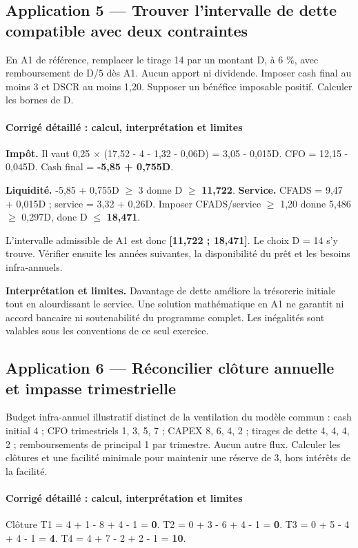 \documentclass[12pt,a4paper]{article}
\begin{document}
\subsection*{Application 5 --- Trouver l’intervalle de dette compatible avec deux contraintes}
En A1 de référence, remplacer le tirage 14 par un montant D, à 6 \%, avec remboursement de D/5 dès A1. Aucun apport ni dividende. Imposer cash final au moins 3 et DSCR au moins 1,20. Supposer un bénéfice imposable positif. Calculer les bornes de D.


\paragraph{Corrigé détaillé : calcul, interprétation et limites}
\textbf{Impôt.} Il vaut 0,25 $\times$ (17,52 - 4 - 1,32 - 0,06D) = 3,05 - 0,015D. CFO = 12,15 - 0,045D. Cash final = \textbf{-5,85 + 0,755D}.

\textbf{Liquidité.} -5,85 + 0,755D $\geq$ 3 donne D $\geq$ \textbf{11,722}. \textbf{Service.} CFADS = 9,47 + 0,015D ; service = 3,32 + 0,26D. Imposer CFADS/service $\geq$ 1,20 donne 5,486 $\geq$ 0,297D, donc D $\leq$ \textbf{18,471}.

L’intervalle admissible de A1 est donc \textbf{[11,722 ; 18,471]}. Le choix D = 14 s’y trouve. Vérifier ensuite les années suivantes, la disponibilité du prêt et les besoins infra-annuels.

\textbf{Interprétation et limites.} Davantage de dette améliore la trésorerie initiale tout en alourdissant le service. Une solution mathématique en A1 ne garantit ni accord bancaire ni soutenabilité du programme complet. Les inégalités sont valables sous les conventions de ce seul exercice.


\subsection*{Application 6 --- Réconcilier clôture annuelle et impasse trimestrielle}
Budget infra-annuel illustratif distinct de la ventilation du modèle commun : cash initial 4 ; CFO trimestriels 1, 3, 5, 7 ; CAPEX 8, 6, 4, 2 ; tirages de dette 4, 4, 4, 2 ; remboursements de principal 1 par trimestre. Aucun autre flux. Calculer les clôtures et une facilité minimale pour maintenir une réserve de 3, hors intérêts de la facilité.


\paragraph{Corrigé détaillé : calcul, interprétation et limites}
Clôture T1 = 4 + 1 - 8 + 4 - 1 = \textbf{0}. T2 = 0 + 3 - 6 + 4 - 1 = \textbf{0}. T3 = 0 + 5 - 4 + 4 - 1 = \textbf{4}. T4 = 4 + 7 - 2 + 2 - 1 = \textbf{10}.
\end{document}
